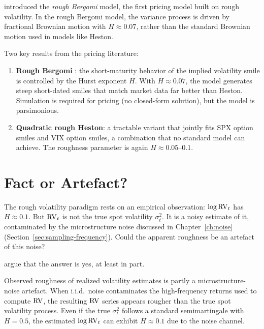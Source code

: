 \citet{BFG2016} introduced the \emph{rough Bergomi} model, the first pricing model built on rough volatility.
In the rough Bergomi model, the variance process is driven by fractional Brownian motion with $H \approx 0.07$, rather than the standard Brownian motion used in models like Heston.

Two key results from the pricing literature:

\begin{enumerate}[nosep]
  \item \textbf{Rough Bergomi} \citep{BFG2016}: the short-maturity behavior of the implied volatility smile is controlled by the Hurst exponent $H$. With $H \approx 0.07$, the model generates steep short-dated smiles that match market data far better than Heston. Simulation is required for pricing (no closed-form solution), but the model is parsimonious.

  \item \textbf{Quadratic rough Heston}: a tractable variant that jointly fits SPX option smiles and VIX option smiles, a combination that no standard model can achieve. The roughness parameter is again $H \approx 0.05$--$0.1$.
\end{enumerate}

\section{Fact or Artefact?}
\label{sec:fact-or-artefact}

The rough volatility paradigm rests on an empirical observation: $\log \operatorname{RV}_t$ has $H \approx 0.1$.
But $\operatorname{RV}_t$ is not the true spot volatility $\sigma^2_t$.
It is a noisy estimate of it, contaminated by the microstructure noise discussed in Chapter~\ref{ch:noise} (Section~\ref{sec:sampling-frequency}).
Could the apparent roughness be an artefact of this noise?

\citet{ContDas2024} argue that the answer is yes, at least in part.

\begin{keyresult}
Observed roughness of realized volatility estimates is partly a microstructure-noise artefact.
When i.i.d.\ noise contaminates the high-frequency returns used to compute $\operatorname{RV}$, the resulting $\operatorname{RV}$ series appears rougher than the true spot volatility process.
Even if the true $\sigma^2_t$ follows a standard semimartingale with $H = 0.5$, the estimated $\log \operatorname{RV}_t$ can exhibit $H \approx 0.1$ due to the noise channel.
\end{keyresult}

